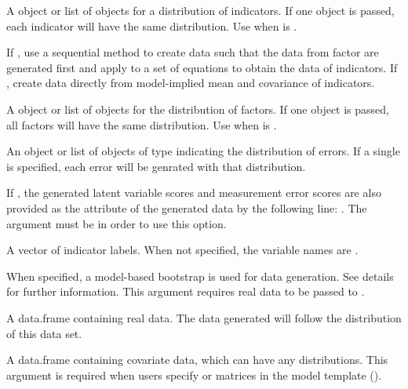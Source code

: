 \documentclass[a4paper]{book}
\begin{document}
\begin{Arguments}
\begin{ldescription}
\item[\code{indDist}]  
A  object or list of objects for a distribution of indicators. If one object is passed, each indicator will have the same distribution. Use when  is .

\item[\code{sequential}]  
If , use a sequential method to create data such that the data from factor are generated first and apply to a set of equations to obtain the data of indicators. If , create data directly from model-implied mean and covariance of indicators.

\item[\code{facDist}]  
A  object or list of objects for the distribution of factors. If one object is passed, all factors will have the same distribution. Use when  is .

\item[\code{errorDist}]  
An object or list of objects of type  indicating the distribution of errors. If a single  is specified, each error will be genrated with that distribution.

\item[\code{saveLatentVar}]  
If , the generated latent variable scores and measurement error scores are also provided as the  attribute of the generated data by the following line: . The  argument must be  in order to use this option.

\item[\code{indLab}]  
A vector of indicator labels. When not specified, the variable names are .

\item[\code{modelBoot}]  
When specified, a model-based bootstrap is used for data generation. See details for further information. This argument requires real data to be passed to .

\item[\code{realData}]  
A data.frame containing real data. The data generated will follow the distribution of this data set.

\item[\code{covData}]  
A data.frame containing covariate data, which can have any distributions. This argument is required when users specify  or  matrices in the model template ().


\end{ldescription}
\end{Arguments}
\end{document}
